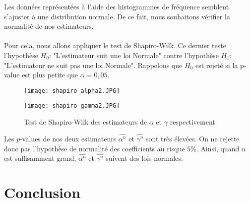 \documentclass[12pt,a4paper]{report}
\theoremstyle{remark}
\begin{document}
Les données représentées à l'aide des histogrammes de fréquence semblent s'ajuster à une distribution normale. De ce fait, nous souhaitons vérifier la normalité de nos estimateurs. \\
\\
Pour cela, nous allons appliquer le  test de Shapiro-Wilk. Ce dernier  teste l'hypothèse $H_0$: "L'estimateur suit une loi Normale" contre l'hypothèse $H_1$: "L'estimateur ne suit pas une loi Normale". Rappelons que $H_0$ est rejeté si la p-value est plus petite que $\alpha=0,05$.
\newpage
\begin{figure}[h!]
 \begin{minipage}[c]{0.25\linewidth}
        \centering
        \texttt{[image: shapiro\_alpha2.JPG]}
    \end{minipage}
    \hfill%
    \vspace{0.1cm}
    \begin{minipage}[c]{0.50\linewidth}
        \centering
       \texttt{[image: shapiro\_gamma2.JPG]}
    \end{minipage}
    \caption{Test de Shapiro-Wilk des estimateurs de $\alpha$ et $\gamma$ respectivement}

\end{figure}

Les $p$-values de nos deux estimateurs $\hat{\alpha^n}$ et $\hat{\gamma^n}$ sont très élevées. On ne rejette donc pas l'hypothèse de normalité des coefficients au risque $5 \%$. Ainsi, quand $n$ est suffisamment grand, $\hat{\alpha^n}$ et $\hat{\gamma^n}$ suivent des lois normales.


\newpage
\section*{Conclusion}
\vspace{0.6cm}
\end{document}
